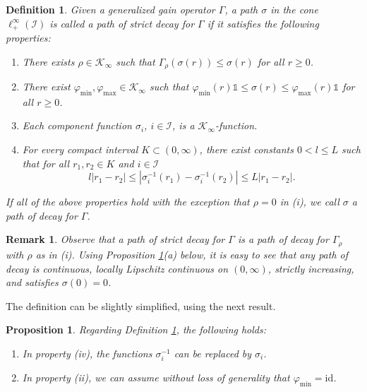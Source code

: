 \documentclass[10pt, oneside, a4paper]{article}
\newcommand{\unit}{\mathds{1}}
\newcommand{\id}{\mathrm{id}}
\newcommand{\IC}{\mathcal{I}}
\newcommand{\KC}{\mathcal{K}}
\newtheorem{proposition}{Proposition}[section]
\newtheorem{definition}{Definition}[section]
\newtheorem{remark}{Remark}[section]
\begin{document}
\begin{definition}\label{def_path_of_decay}
Given a generalized gain operator $\Gamma$, a path $\sigma$ in the cone $\ell^{\infty}_+(\IC)$ is called a \emph{path of strict decay} for $\Gamma$ if it satisfies the following properties:%
\begin{enumerate}
\item[(i)] There exists $\rho \in \KC_{\infty}$ such that $\Gamma_{\rho}(\sigma(r)) \leq \sigma(r)$ for all $r \geq 0$.%
\item[(ii)] There exist $\varphi_{\min},\varphi_{\max} \in \KC_{\infty}$ such that $\varphi_{\min}(r)\unit \leq \sigma(r) \leq \varphi_{\max}(r)\unit$ for all $r \geq 0$.%
\item[(iii)] Each component function $\sigma_i$, $i \in \IC$, is a $\KC_{\infty}$-function.%
\item[(iv)] For every compact interval $K \subset (0,\infty)$, there exist constants $0 < l \leq L$ such that for all $r_1,r_2 \in K$ and $i \in \IC$%
\begin{equation*}
  l|r_1 - r_2| \leq |\sigma_i^{-1}(r_1) - \sigma_i^{-1}(r_2)| \leq L|r_1 - r_2|.%
\end{equation*}
\end{enumerate}
If all of the above properties hold with the exception that $\rho = 0$ in (i), we call $\sigma$ a \emph{path of decay} for $\Gamma$.
\end{definition}

\begin{remark}
Observe that a path of strict decay for $\Gamma$ is a path of decay for $\Gamma_{\rho}$ with $\rho$ as in (i). Using Proposition \ref{prop_path_of_decay}(a) below, it is easy to see that any path of decay is continuous, locally Lipschitz continuous on $(0,\infty)$, strictly increasing, and satisfies $\sigma(0) = 0$.
\end{remark}

The definition can be slightly simplified, using the next result.%

\begin{proposition}\label{prop_path_of_decay}
Regarding Definition \ref{def_path_of_decay}, the following holds:%
\begin{enumerate}
\item[(a)] In property (iv), the functions $\sigma_i^{-1}$ can be replaced by $\sigma_i$.%
\item[(b)] In property (ii), we can assume without loss of generality that $\varphi_{\min} = \id$.%
\end{enumerate}
\end{proposition}
\end{document}
